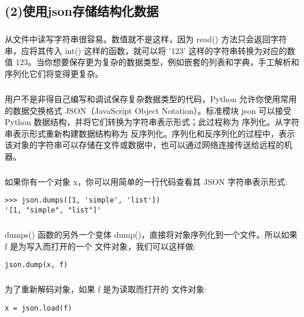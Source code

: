 \documentclass{article}
\begin{document}
\begin{CJK}{UTF8}{gbsn}
\subsection*{(2)使用json存储结构化数据}
\subparagraph*{}
从文件中读写字符串很容易。数值就不是这样，因为 read() 方法只会返回字符串，应将其传入 int() 这样的函数，就可以将 '123' 这样的字符串转换为对应的数值 123。当你想要保存更为复杂的数据类型，例如嵌套的列表和字典，手工解析和序列化它们将变得更复杂。
\subparagraph*{}
用户不是非得自己编写和调试保存复杂数据类型的代码，Python 允许你使用常用的数据交换格式 JSON（JavaScript Object Notation）。标准模块 json 可以接受 Python 数据结构，并将它们转换为字符串表示形式；此过程称为 序列化。从字符串表示形式重新构建数据结构称为 反序列化。序列化和反序列化的过程中，表示该对象的字符串可以存储在文件或数据中，也可以通过网络连接传送给远程的机器。
\subparagraph*{}
如果你有一个对象 x，你可以用简单的一行代码查看其 JSON 字符串表示形式:
\begin{verbatim}
>>> json.dumps([1, 'simple', 'list'])
'[1, "simple", "list"]'
\end{verbatim}
\subparagraph*{}
dumps() 函数的另外一个变体 dump()，直接将对象序列化到一个文件。所以如果 f 是为写入而打开的一个 文件对象，我们可以这样做:
\begin{verbatim}
json.dump(x, f)
\end{verbatim}
\subparagraph*{}
为了重新解码对象，如果 f 是为读取而打开的 文件对象:
\begin{verbatim}
x = json.load(f)
\end{verbatim}
\end{CJK}
\end{document}
